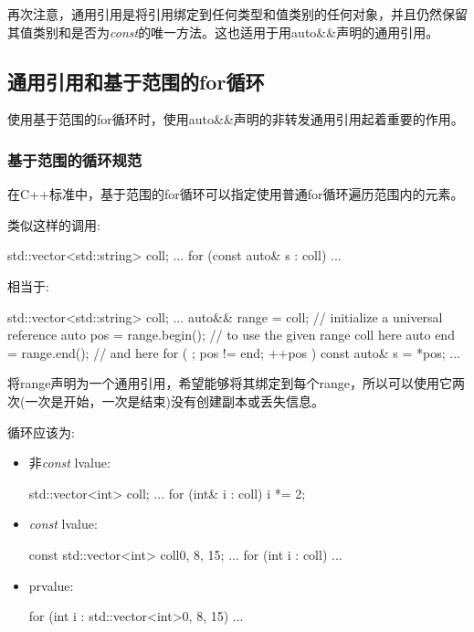 再次注意，通用引用是将引用绑定到任何类型和值类别的任何对象，并且仍然保留其值类别和是否为\textit{const}的唯一方法。这也适用于用auto\&\&声明的通用引用。

\subsection{通用引用和基于范围的for循环}

使用基于范围的for循环时，使用auto\&\&声明的非转发通用引用起着重要的作用。

\subsubsection{基于范围的循环规范}

在C++标准中，基于范围的for循环可以指定使用普通for循环遍历范围内的元素。

类似这样的调用:

\begin{cppcode}
std::vector<std::string> coll;
...
for (const auto& s : coll) {
	...
}
\end{cppcode}

相当于:

\begin{cppcode}
std::vector<std::string> coll;
...
auto&& range = coll; // initialize a universal reference
auto pos = range.begin(); // to use the given range coll here
auto end = range.end(); // and here
for ( ; pos != end; ++pos ) {
	const auto& s = *pos;
	...
}
\end{cppcode}

将range声明为一个通用引用，希望能够将其绑定到每个range，所以可以使用它两次(一次是开始，一次是结束)没有创建副本或丢失信息。

循环应该为:

\begin{itemize}
\item 非\textit{const} lvalue:
\begin{cppcode}
std::vector<int> coll;
...
for (int& i : coll) {
	i *= 2;
}
\end{cppcode}
\item \textit{const} lvalue:
\begin{cppcode}
const std::vector<int> coll{0, 8, 15};
...
for (int i : coll) {
	...
}
\end{cppcode}
\item prvalue:
\begin{cppcode}
for (int i : std::vector<int>{0, 8, 15}) {
	...
}
\end{cppcode}
\end{itemize}

